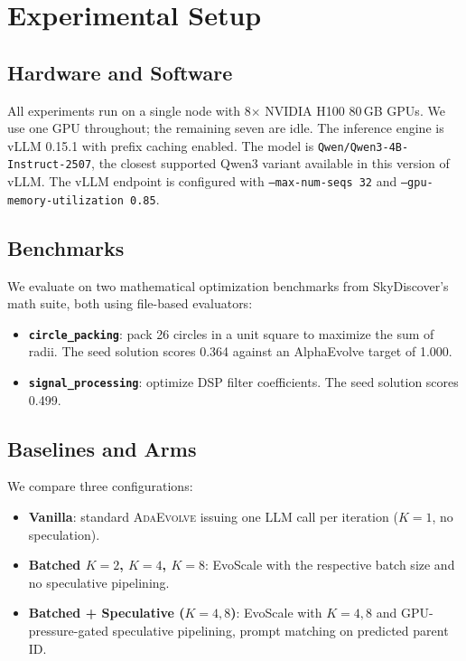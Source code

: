 \documentclass{article}
\newcommand{\adaev}{\textsc{AdaEvolve}}
\begin{document}
\section{Experimental Setup}

\subsection{Hardware and Software}

All experiments run on a single node with 8$\times$ NVIDIA H100 80\,GB
GPUs. We use one GPU throughout; the remaining seven are idle. The
inference engine is vLLM 0.15.1 with prefix caching enabled. The model
is \texttt{Qwen/Qwen3-4B-Instruct-2507}, the closest supported Qwen3
variant available in this version of vLLM. The vLLM endpoint is
configured with \texttt{--max-num-seqs 32} and
\texttt{--gpu-memory-utilization 0.85}.

\subsection{Benchmarks}

We evaluate on two mathematical optimization benchmarks from
SkyDiscover's math suite, both using file-based evaluators:

\begin{itemize}
    \item \textbf{\texttt{circle\_packing}}: pack 26 circles in a unit
    square to maximize the sum of radii. The seed solution scores 0.364
    against an AlphaEvolve target of 1.000.
    \item \textbf{\texttt{signal\_processing}}: optimize DSP filter
    coefficients. The seed solution scores 0.499.
\end{itemize}

\subsection{Baselines and Arms}

We compare three configurations:

\begin{itemize}
    \item \textbf{Vanilla}: standard \adaev{} issuing one LLM call per
    iteration ($K{=}1$, no speculation).
    \item \textbf{Batched $K{=}2$, $K{=}4$, $K{=}8$}: EvoScale with the
    respective batch size and no speculative pipelining.
    \item \textbf{Batched + Speculative ($K{=}4,8$)}: EvoScale with $K{=}4,8$
    and GPU-pressure-gated speculative pipelining, prompt matching on
    predicted parent ID.
\end{itemize}
\end{document}
